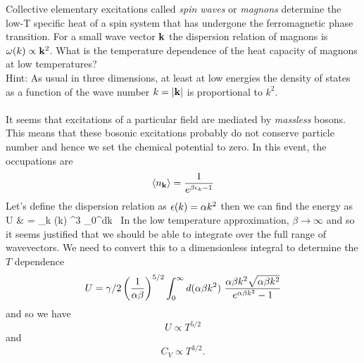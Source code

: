 \documentclass[10pt,letterpaper]{article}
\begin{document}
	\item
	Collective elementary excitations called \emph{spin waves} or \emph{magnons} determine the low-T
	specific heat of a spin system that has undergone the ferromagnetic phase transition. For a small wave 
	vector $\mathbf{k}$ the dispersion relation of magnons is $\omega(k) \propto \mathbf{k}^2$. What is the temperature
	dependence of the heat capacity of magnons at low temperatures? \\
	Hint: As usual in three dimensions, at least at low energies the density of states as a function
	of the wave number $k =|\mathbf{k}|$ is proportional to $k^2$. 
	\\ \\
	It seems that excitations of a particular field are mediated by \emph{massless} bosons. This means that
	these bosonic excitations probably do not conserve particle number and hence we set the
	chemical potential to zero. In this event, the occupations are
	\[
		\braket{n_{\mathbf{k}}} = \frac{1}{e^{\beta \epsilon_k-1}}
	\]
	Let's define the dispersion relation as $\epsilon(k) = \alpha k^2$ then we can find the energy as
	\ba
		U & = \sum_\vect k \ep(k) \pi\alpha{}^3
		 \int_0^\infty dk\ 
	\ea
	In the low temperature approximation, $\beta \to \infty$ and so it seems justified that we should
	be able to integrate over the full range of wavevectors. We need to convert this to a dimensionless
	integral to determine the $T$ dependence
	\[
		U = \gamma/2 \pfrac{1}{\alpha\beta}^{5/2}  \int_0^\infty d(\alpha\beta k^2)\ \frac{\alpha\beta k^2\sqrt{\alpha
		\beta k^2}}{e^{\alpha\beta k^2}-1}
	\]
	and so we have
	\[
		U \propto T^{5/2}
	\]
	and
	\[
		C_V \propto T^{3/2}.
	\]
	
	\eenum
\end{document}
